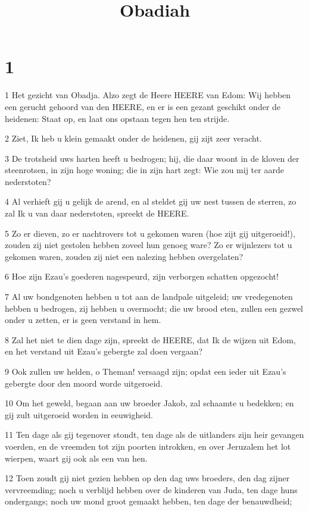 

\title{Obadiah}



\chapter{1}

\par 1 Het gezicht van Obadja. Alzo zegt de Heere HEERE van Edom: Wij hebben een gerucht gehoord van den HEERE, en er is een gezant geschikt onder de heidenen: Staat op, en laat ons opstaan tegen hen ten strijde.
\par 2 Ziet, Ik heb u klein gemaakt onder de heidenen, gij zijt zeer veracht.
\par 3 De trotsheid uws harten heeft u bedrogen; hij, die daar woont in de kloven der steenrotsen, in zijn hoge woning; die in zijn hart zegt: Wie zou mij ter aarde nederstoten?
\par 4 Al verhieft gij u gelijk de arend, en al steldet gij uw nest tussen de sterren, zo zal Ik u van daar nederstoten, spreekt de HEERE.
\par 5 Zo er dieven, zo er nachtrovers tot u gekomen waren (hoe zijt gij uitgeroeid!), zouden zij niet gestolen hebben zoveel hun genoeg ware? Zo er wijnlezers tot u gekomen waren, zouden zij niet een nalezing hebben overgelaten?
\par 6 Hoe zijn Ezau's goederen nagespeurd, zijn verborgen schatten opgezocht!
\par 7 Al uw bondgenoten hebben u tot aan de landpale uitgeleid; uw vredegenoten hebben u bedrogen, zij hebben u overmocht; die uw brood eten, zullen een gezwel onder u zetten, er is geen verstand in hem.
\par 8 Zal het niet te dien dage zijn, spreekt de HEERE, dat Ik de wijzen uit Edom, en het verstand uit Ezau's gebergte zal doen vergaan?
\par 9 Ook zullen uw helden, o Theman! versaagd zijn; opdat een ieder uit Ezau's gebergte door den moord worde uitgeroeid.
\par 10 Om het geweld, begaan aan uw broeder Jakob, zal schaamte u bedekken; en gij zult uitgeroeid worden in eeuwigheid.
\par 11 Ten dage als gij tegenover stondt, ten dage als de uitlanders zijn heir gevangen voerden, en de vreemden tot zijn poorten introkken, en over Jeruzalem het lot wierpen, waart gij ook als een van hen.
\par 12 Toen zoudt gij niet gezien hebben op den dag uws broeders, den dag zijner vervreemding; noch u verblijd hebben over de kinderen van Juda, ten dage huns ondergangs; noch uw mond groot gemaakt hebben, ten dage der benauwdheid;
